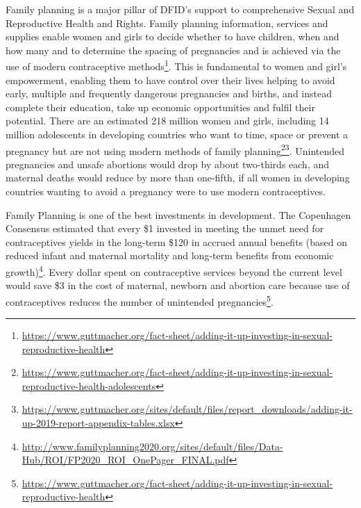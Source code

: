 Family planning is a major pillar of DFID's support to comprehensive Sexual and Reproductive Health and Rights. %
Family planning information, services and supplies enable women and girls to decide whether to have children, when and how many and to determine the spacing of pregnancies and is achieved via the use of modern contraceptive methods\footnote{\href{https://www.guttmacher.org/fact-sheet/adding-it-up-investing-in-sexual-reproductive-health}{https://www.guttmacher.org/fact-sheet/adding-it-up-investing-in-sexual-reproductive-health}}. %
This is fundamental to women and girl's empowerment, enabling them to have control over their lives helping to avoid early, multiple and frequently dangerous pregnancies and births, and instead complete their education, take up economic opportunities and fulfil their potential. %
There are an estimated 218 million women and girls, including 14 million adolescents in developing countries who want to time, space or prevent a pregnancy but are not using modern methods of family planning\footnote{\href{https://www.guttmacher.org/fact-sheet/adding-it-up-investing-in-sexual-reproductive-health-adolescents}{https://www.guttmacher.org/fact-sheet/adding-it-up-investing-in-sexual-reproductive-health-adolescents}}\footnote{\href{https://www.guttmacher.org/sites/default/files/report_downloads/adding-it-up-2019-report-appendix-tables.xlsx}{https://www.guttmacher.org/sites/default/files/report\_downloads/adding-it-up-2019-report-appendix-tables.xlsx}}. %
Unintended pregnancies and unsafe abortions would drop by about two-thirds each, and maternal deaths would reduce by more than one-fifth, if all women in developing countries wanting to avoid a pregnancy were to use modern contraceptives. %

Family Planning is one of the best investments in development. %
The Copenhagen Consensus estimated that every \$1 invested in meeting the unmet need for contraceptives yields in the long-term \$120 in accrued annual benefits (based on reduced infant and maternal mortality and long-term benefits from economic growth)\footnote{\href{http://www.familyplanning2020.org/sites/default/files/Data-Hub/ROI/FP2020_ROI_OnePager_FINAL.pdf}{http://www.familyplanning2020.org/sites/default/files/Data-Hub/ROI/FP2020\_ROI\_OnePager\_FINAL.pdf}}. %
Every dollar spent on contraceptive services beyond the current level would save \$3 in the cost of maternal, newborn and abortion care because use of contraceptives reduces the number of unintended pregnancies\footnote{\href{https://www.guttmacher.org/fact-sheet/adding-it-up-investing-in-sexual-reproductive-health}{https://www.guttmacher.org/fact-sheet/adding-it-up-investing-in-sexual-reproductive-health}}. %

